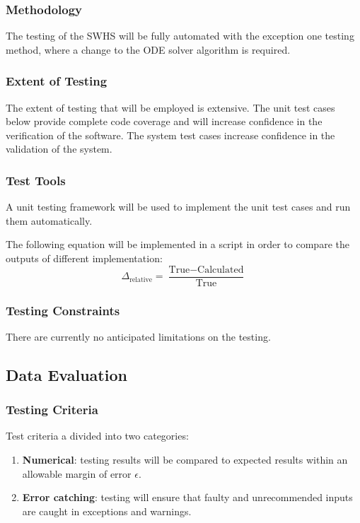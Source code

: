 \documentclass[12pt]{article}
\begin{document}
\subsubsection{Methodology} 
The testing of the SWHS will be fully automated with the exception one testing 
method, where a change to the ODE solver algorithm is required.

\subsubsection{Extent of Testing}
The extent of testing that will be employed is extensive. The unit test
 cases below provide complete code coverage and will increase confidence in the
  verification of the software. The system test cases increase confidence in the 
  validation of the system.

\subsubsection{Test Tools}
A unit testing framework will be used to implement the unit test cases and run them automatically.

The following equation will be implemented in a script in order to compare the outputs of different implementation:
$$\Delta_{\text{relative}} = \frac{\text{True} - \text{Calculated}}
 {\text{True}} $$

\subsubsection{ Testing Constraints}
There are currently no anticipated limitations on the testing.

\subsection{ Data Evaluation}

\subsubsection{ Testing Criteria}
Test criteria a divided into two categories:
\begin{enumerate}
\item \textbf{Numerical}: testing results will be compared to expected results within an allowable margin of error $\epsilon$.

\item \textbf{Error catching}: testing will ensure that faulty and unrecommended
 inputs are caught in exceptions and warnings. 
\end{enumerate}
\end{document}
